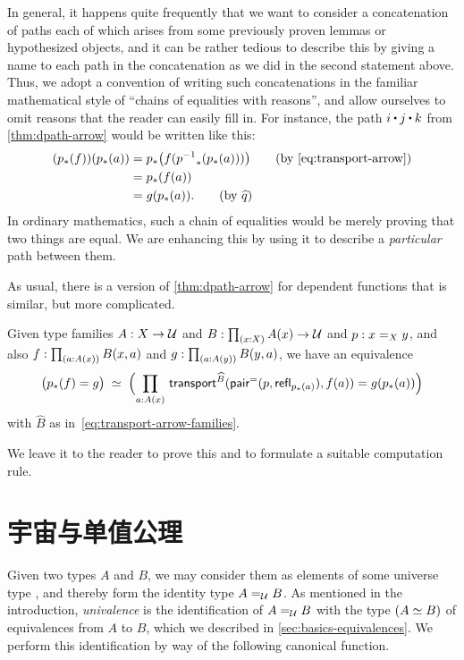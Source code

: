 In general, it happens quite frequently that we want to consider a concatenation of paths each of which arises from some previously proven lemmas or hypothesized objects, and it can be rather tedious to describe this by giving a name to each path in the concatenation as we did in the second statement above.
Thus, we adopt a convention of writing such concatenations in the familiar mathematical style of ``chains of equalities with reasons'', and allow ourselves to omit reasons that the reader can easily fill in.
For instance, the path $i\ct j\ct k$ from \cref{thm:dpath-arrow} would be written like this:
  \begin{align*}
    (\trans p f)(\trans p a)
    &= \trans p {f (\trans {\opp p}{\trans p a})}
    \tag{by~\eqref{eq:transport-arrow}}\\
    &= \trans p {f(a)}\\
    &= g(\trans p a).
    \tag{by $\widehat{q}$}
  \end{align*}
In ordinary mathematics, such a chain of equalities would be merely proving that two things are equal.
We are enhancing this by using it to describe a \emph{particular} path between them.

As usual, there is a version of \cref{thm:dpath-arrow} for dependent functions that is similar, but more complicated.

\begin{lem}\label{thm:dpath-forall}
  Given type families $A:X\to\type$ and $B:\prd{x:X} A(x)\to\type$ and $p:\id[X]xy$, and also $f:\prd{a:A(x)} B(x,a)$ and $g:\prd{a:A(y)} B(y,a)$, we have an equivalence
  \[ \eqvspaced{ \big(\trans{p}{f} = {g}\big) } { \Parens{\prd{a:A(x)}  \transfib{\widehat{B}}{\pairpath(p,\refl{\trans pa})}{f(a)} = g(\trans{p}{a}) } } \]
  with $\widehat{B}$ as in~\eqref{eq:transport-arrow-families}.
\end{lem}

We leave it to the reader to prove this and to formulate a suitable computation rule.

%
%
%

\section{宇宙与单值公理}
\label{sec:compute-universe}

%
%
Given two types $A$ and $B$, we may consider them as elements of some universe type \type, and thereby form the identity type $\id[\type]AB$.
As mentioned in the introduction, \emph{univalence} is the identification of $\id[\type]AB$ with the type $(\eqv AB)$ of equivalences from $A$ to $B$, which we described in \cref{sec:basics-equivalences}.
We perform this identification by way of the following canonical function.

